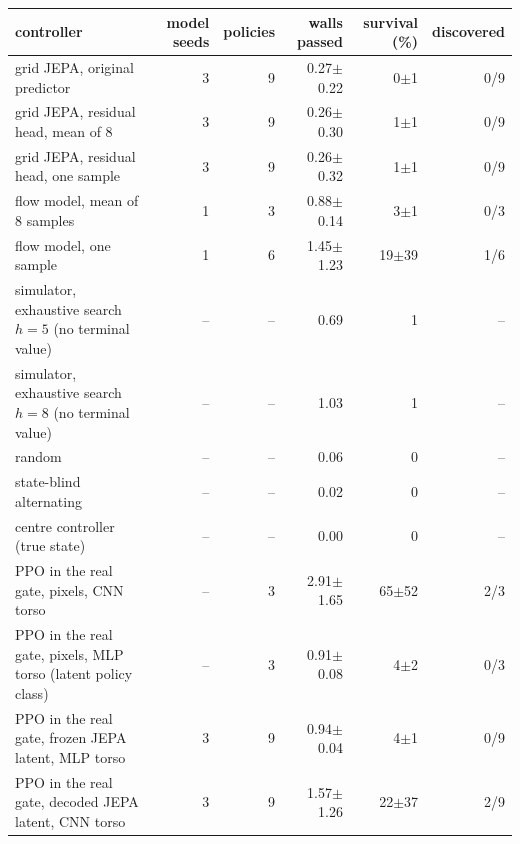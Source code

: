 \begin{tabular}{lrrrrr}
\toprule
controller & model seeds & policies & walls passed & survival (\%) & discovered \\
\midrule
grid JEPA, original predictor & 3 & 9 & 0.27$\pm$0.22 & 0$\pm$1 & 0/9 \\
grid JEPA, residual head, mean of 8 & 3 & 9 & 0.26$\pm$0.30 & 1$\pm$1 & 0/9 \\
grid JEPA, residual head, one sample & 3 & 9 & 0.26$\pm$0.32 & 1$\pm$1 & 0/9 \\
flow model, mean of 8 samples & 1 & 3 & 0.88$\pm$0.14 & 3$\pm$1 & 0/3 \\
flow model, one sample & 1 & 6 & 1.45$\pm$1.23 & 19$\pm$39 & 1/6 \\
simulator, exhaustive search $h=5$ (no terminal value) & -- & -- & 0.69 & 1 & -- \\
simulator, exhaustive search $h=8$ (no terminal value) & -- & -- & 1.03 & 1 & -- \\
random & -- & -- & 0.06 & 0 & -- \\
state-blind alternating & -- & -- & 0.02 & 0 & -- \\
centre controller (true state) & -- & -- & 0.00 & 0 & -- \\
PPO in the real gate, pixels, CNN torso & -- & 3 & 2.91$\pm$1.65 & 65$\pm$52 & 2/3 \\
PPO in the real gate, pixels, MLP torso (latent policy class) & -- & 3 & 0.91$\pm$0.08 & 4$\pm$2 & 0/3 \\
PPO in the real gate, frozen JEPA latent, MLP torso & 3 & 9 & 0.94$\pm$0.04 & 4$\pm$1 & 0/9 \\
PPO in the real gate, decoded JEPA latent, CNN torso & 3 & 9 & 1.57$\pm$1.26 & 22$\pm$37 & 2/9 \\
\bottomrule
\end{tabular}
